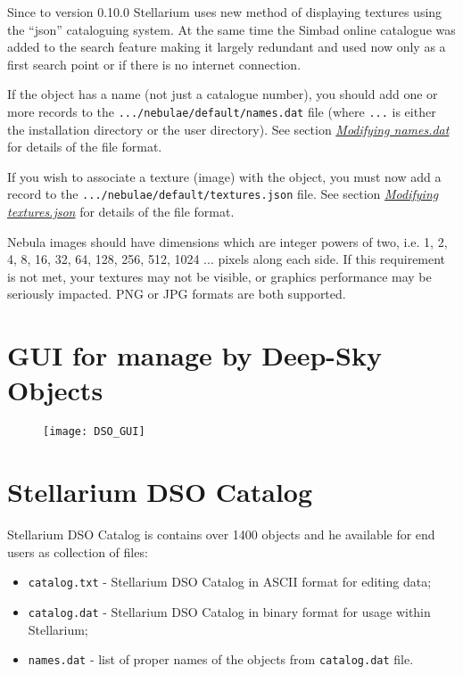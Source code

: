 Since to version 0.10.0 Stellarium uses new method of displaying
textures using the ``json'' cataloguing system. At the same time the
Simbad online catalogue was added to the search feature making it
largely redundant and used now only as a first search point or if there
is no internet connection.

If the object has a name (not just a catalogue number), you should add
one or more records to the \texttt{.../nebulae/default/names.dat} file
(where \texttt{...} is either the installation directory or the user
directory). See section
\emph{\protect\hyperlink{Modifyingux5fnames.dat}{Modifying names.dat}}
for details of the file format.

If you wish to associate a texture (image) with the object, you must now
add a record to the \texttt{.../nebulae/default/textures.json} file. See
section \emph{\protect\hyperlink{Modifyingux5ftextures.json}{Modifying
textures.json}} for details of the file format.

Nebula images should have dimensions which are integer powers of two,
i.e. 1, 2, 4, 8, 16, 32, 64, 128, 256, 512, 1024 ... pixels along each
side. If this requirement is not met, your textures may not be visible,
or graphics performance may be seriously impacted. PNG or JPG formats
are both supported.

\section{GUI for manage by Deep-Sky
Objects}\label{gui-for-manage-by-deep-sky-objects}

\begin{figure}[h]
\centering\texttt{[image: DSO\_GUI]}
\end{figure}

\section{Stellarium DSO Catalog}\label{stellarium-dso-catalog}

Stellarium DSO Catalog is contains over 1400 objects and he available
for end users as collection of files:

\begin{itemize}
\item
  \texttt{catalog.txt} - Stellarium DSO Catalog in ASCII format for
  editing data;
\item
  \texttt{catalog.dat} - Stellarium DSO Catalog in binary format for
  usage within Stellarium;
\item
  \texttt{names.dat} - list of proper names of the objects from
  \texttt{catalog.dat} file.
\end{itemize}

